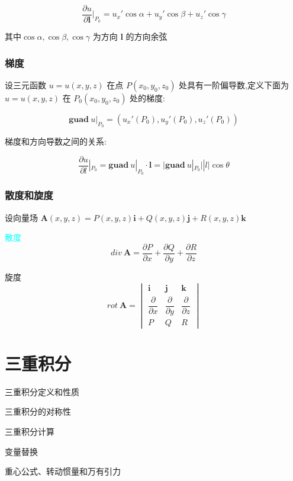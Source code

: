\begin{theorem}[方向导数计算公式]
	$$\dfrac{\partial u}{\partial \boldsymbol{l}}|_{P_{0}}=u_{x}'\cos \alpha+u_{y}'\cos \beta+u_{z}'\cos \gamma$$
	
	其中$\cos \alpha,\cos \beta,\cos \gamma$ 为方向 $\boldsymbol{l}$ 的方向余弦
\end{theorem}

\subsection{梯度}

\begin{definition}[梯度]
	
	设三元函数 $u=u(x,y,z)$ 在点 $P(x_{0},y_{0},z_{0})$ 处具有一阶偏导数,定义下面为 $u=u(x,y,z)$ 在 $ P_{0}(x_{0},y_{0},z_{0})$ 处的梯度: 
	
	$$\boldsymbol{guad}\ u|_{P_{0}}=(u_{x}'(P_{0}),u_{y}'(P_{0}),u_{z}'(P_{0}))$$
	
	
	梯度和方向导数之间的关系: 

	$$\dfrac{\partial u}{\partial l}|_{P_{0}}=\boldsymbol{guad}\ u|_{P_{0}}\cdot \boldsymbol{l}=\big|\boldsymbol{guad}\ u|_{P_{0}}\big| |l|\cos \theta$$
\end{definition}

\subsection{散度和旋度}

\begin{definition}[散度和旋度]
	设向量场 $\boldsymbol{A}(x,y,z)=P(x,y,z)\boldsymbol{i} + Q(x,y,z)\boldsymbol{j} + R(x,y,z)\boldsymbol{k}$
	
	\textcolor{cyan}{散度} 
	$$div\ \boldsymbol{A}=\dfrac{\partial P}{\partial x}+\dfrac{\partial Q}{\partial y}+\dfrac{\partial R}{\partial z}$$
	
	\textcolor{purplea}{旋度}
	$$rot \ \boldsymbol{A} = 
	\begin{vmatrix}
		\boldsymbol{i} & \boldsymbol{j} & \boldsymbol{k}\\
		\dfrac{\partial}{\partial x} & \dfrac{\partial}{\partial y} & \dfrac{\partial}{\partial z} \\
		P & Q & R
	\end{vmatrix}$$
\end{definition}



\chapter{三重积分}
\begin{introduction}
	\item 三重积分定义和性质
	\item 三重积分的对称性
	\item 三重积分计算
	\item 变量替换
	\item 重心公式、转动惯量和万有引力
\end{introduction}

